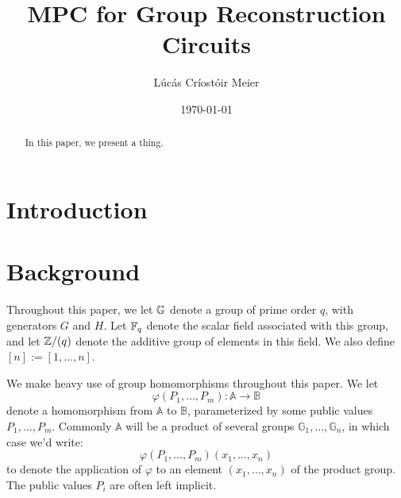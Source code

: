 

\date{\today}
\title{MPC for Group Reconstruction Circuits}
\author{Lúcás Críostóir Meier}



\maketitle

\begin{abstract}
    In this paper, we present a thing.
\end{abstract}

\section{Introduction}








\section{Background}
\label{sec:background}

Throughout this paper, we let $\mathbb{G}$ denote a group of prime order $q$,
with generators $G$ and $H$. Let $\mathbb{F}_q$ denote the scalar field associated
with this group, and let $\mathbb{Z}/(q)$ denote the additive group of elements
in this field. We also define $[n] := [1, \ldots, n]$.

We make heavy use of group homomorphisms throughout this paper.
We let
$$
\varphi(P_1, \ldots, P_m) : \mathbb{A} \to \mathbb{B}
$$
denote a homomorphism from $\mathbb{A}$ to $\mathbb{B}$, parameterized
by some public values $P_1, \ldots, P_m$. Commonly $\mathbb{A}$
will be a product of several groups $\mathbb{G}_1, \ldots, \mathbb{G}_n$,
in which case we'd write:
$$
\varphi(P_1, \ldots, P_m)(x_1, \ldots, x_n)
$$
to denote the application of $\varphi$ to an element $(x_1, \ldots, x_n)$
of the product group. The public values $P_i$ are often left implicit.

